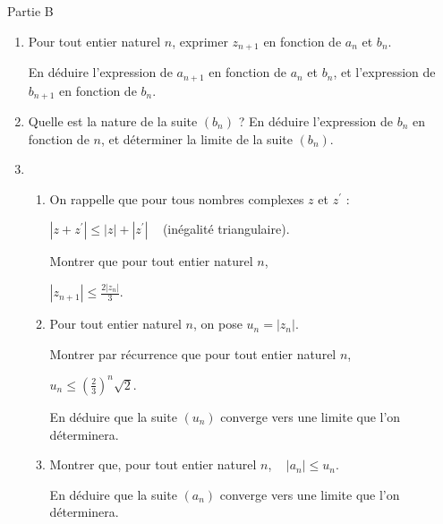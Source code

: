 \begin{h3}Partie B\end{h3}
\begin{enumerate}
     \item
     Pour tout entier naturel $n$, exprimer $z_{n+1}$ en fonction de $a_{n}$ et $b_{n}$.
     \par
     En déduire l'expression de $a_{n+1}$ en fonction de $a_{n}$ et $b_{n}$, et l'expression de $b_{n+1}$ en fonction de $b_{n}$.
     \item
     Quelle est la nature de la suite $\left(b_{n}\right)$ ? En déduire l'expression de $b_{n}$ en fonction de $n$, et déterminer la limite de la suite $\left(b_{n}\right)$.
     \item
     \begin{enumerate}
          \item
          On rappelle que pour tous nombres complexes $z$ et $z^{\prime}$ :
          \begin{center}$|z+z^{\prime}|\leqslant  |z|+|z^{\prime}|$     (inégalité triangulaire).\end{center}
          Montrer que pour tout entier naturel $n$,
          \begin{center}$|z_{n +1}|\leqslant  \frac{2|z_{n}|}{3}.$\end{center}
          \item
          Pour tout entier naturel $n$, on pose $u_{n}=|z_{n}|$.
          \par
          Montrer par récurrence que pour tout entier naturel $n$,
          \begin{center}$u_{n}\leqslant  \left(\frac{2}{3}\right)^{n} \sqrt{2}.$\end{center}
          En déduire que la suite $\left(u_{n}\right)$ converge vers une limite que l'on déterminera.
          \item
          Montrer que, pour tout entier naturel $n$,    $ |a_{n}| \leqslant  u_{n}$.
          \par
     En déduire que la suite $\left(a_{n}\right)$ converge vers une limite que l'on déterminera.\end{enumerate}
\end{enumerate}
